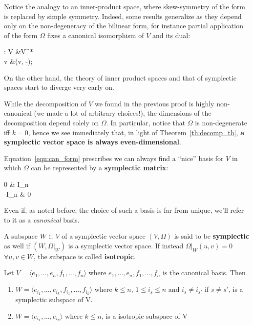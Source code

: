 \documentclass[main.tex]{subfiles}
\begin{document}
\begin{remark}
Notice the analogy to an inner-product space, where skew-symmetry of the form is replaced by simple symmetry. Indeed, some results generalize as they depend only on the non-degeneracy of the bilinear form, for instance partial application of the form $\Omega$ fixes a canonical isomorphism of $V$ and its dual:
\begin{eqalign}
	\tilde\Omega : V &\longto V^*\\
	v &\longmapsto \Omega(v, -);
\end{eqalign}
On the other hand, the theory of inner product spaces and that of symplectic spaces start to diverge very early on.

	While the decomposition of $V$ we found in the previous proof is highly non-canonical (we made a lot of arbitrary choices!), the dimensions of the decomposition depend solely on $\Omega$. In particular, notice that $\Omega$ is non-degenerate iff $k=0$, hence we see immediately that, in light of Theorem~\ref{th:decomp_th}, \textbf{a symplectic vector space is always even-dimensional}.
\end{remark}

Equation~\eqref{eqn:can_form} prescribes we can always find a ``nice'' basis for $V$ in which $\Omega$ can be represented by a \textbf{symplectic matrix}:
\begin{eqalign}
	\begin{pmatrix}
		0 & I_n\\
		-I_n & 0
	\end{pmatrix}
\end{eqalign}
Even if, as noted before, the choice of such a basis is far from unique, we'll refer to it as a \emph{canonical} basis.

\begin{definition}
	A subspace $W\subset V$ of a symplectic vector space $(V, \Omega)$ is said to be \textbf{symplectic} as well if $(W, \Omega\vert_W)$ is a symplectic vector space. If instead $\Omega\vert_W(u,v) = 0$ $\forall u,v\in W$, the subspace is called \textbf{isotropic}.
\end{definition}

\begin{example}
	Let $V=\langle e_1,\dots,e_n,f_1,\dots,f_n\rangle$ where $e_1,\dots,e_n,f_1,\dots,f_n$ is the canonical basis. Then
	\begin{enumerate}
		\item	$W=\langle e_{i_1},\dots,e_{i_k},f_{i_1},\dots,f_{i_k}\rangle$ where $k\leq n$, $1\leq i_s\leq n$ and $i_s\neq i_{s'}$ if $s\neq s'$, is a symplectic subspace of V.
		\item	$W=\langle e_{i_1},\dots,e_{i_k}\rangle$ where $k\leq n$, is a isotropic subspace of V
	\end{enumerate}
\end{example}
\end{document}
